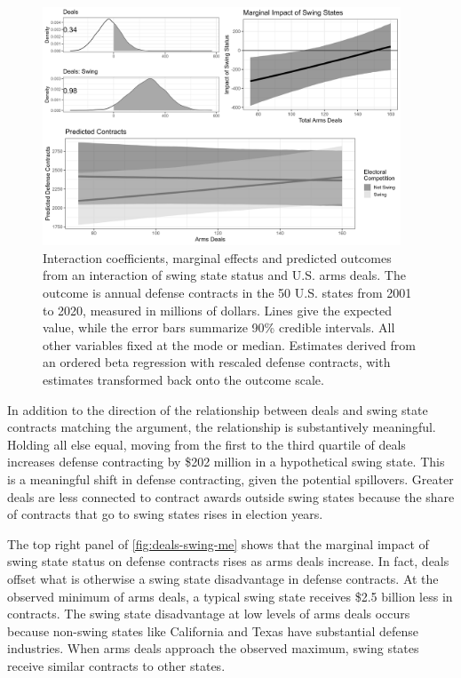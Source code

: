\documentclass[12pt]{article}
\begin{document}
\begin{figure}[htpb]
	\centering
		\includegraphics[width=0.95\textwidth]{../figures/deals-swing-me.png}
	\caption{Interaction coefficients, marginal effects and predicted outcomes from an interaction of swing state status and U.S. arms deals. The outcome is annual defense contracts in the 50 U.S. states from 2001 to 2020, measured in millions of dollars. Lines give the expected value, while the error bars summarize 90\% credible intervals. All other variables fixed at the mode or median. Estimates derived from an ordered beta regression with rescaled defense contracts, with estimates transformed back onto the outcome scale.}
	\label{fig:deals-swing-me}
\end{figure}


In addition to the direction of the relationship between deals and swing state contracts matching the argument, the relationship is substantively meaningful. 
Holding all else equal, moving from the first to the third quartile of deals increases defense contracting by \$202 million in a hypothetical swing state. 
This is a meaningful shift in defense contracting, given the potential spillovers. 
Greater deals are less connected to contract awards outside swing states because the share of contracts that go to swing states rises in election years. 


The top right panel of \autoref{fig:deals-swing-me} shows that the marginal impact of swing state status on defense contracts rises as arms deals increase.  
In fact, deals offset what is otherwise a swing state disadvantage in defense contracts. 
At the observed minimum of arms deals, a typical swing state receives \$2.5 billion less in contracts.
The swing state disadvantage at low levels of arms deals occurs because non-swing states like California and Texas have substantial defense industries.
When arms deals approach the observed maximum, swing states receive similar contracts to other states. 
\end{document}
